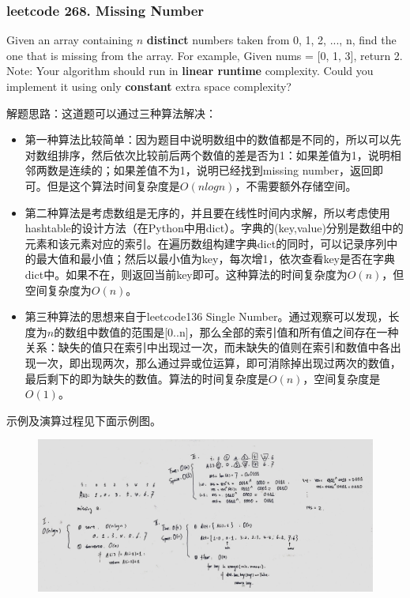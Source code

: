 \documentclass[a4paper,10pt]{article}
\begin{document}
\subsubsection{leetcode 268. Missing Number}
Given an array containing $n$ \textbf{distinct} numbers taken from 0, 1, 2, ..., n, find the one that is missing from the array. For example, Given nums = [0, 1, 3], return 2. \\

\noindent Note: Your algorithm should run in \textbf{linear runtime} complexity. Could you implement it using only \textbf{constant} extra space complexity? \\

\begin{CJK*}{UTF8}{gbsn}
\noindent 解题思路：这道题可以通过三种算法解决：
\begin{itemize}
    \item 第一种算法比较简单：因为题目中说明数组中的数值都是不同的，所以可以先对数组排序，然后依次比较前后两个数值的差是否为1：如果差值为1，说明相邻两数是连续的；如果差值不为1，说明已经找到missing number，返回即可。但是这个算法时间复杂度是$O(nlogn)$，不需要额外存储空间。
    \item 第二种算法是考虑数组是无序的，并且要在线性时间内求解，所以考虑使用hashtable的设计方法（在Python中用dict）。字典的(key,value)分别是数组中的元素和该元素对应的索引。在遍历数组构建字典dict的同时，可以记录序列中的最大值和最小值；然后以最小值为key，每次增1，依次查看key是否在字典dict中。如果不在，则返回当前key即可。这种算法的时间复杂度为$O(n)$，但空间复杂度为$O(n)$。
    \item 第三种算法的思想来自于leetcode136 Single Number。通过观察可以发现，长度为$n$的数组中数值的范围是[0..n]，那么全部的索引值和所有值之间存在一种关系：缺失的值只在索引中出现过一次，而未缺失的值则在索引和数值中各出现一次，即出现两次，那么通过异或位运算，即可消除掉出现过两次的数值，最后剩下的即为缺失的数值。算法的时间复杂度是$O(n)$，空间复杂度是$O(1)$。
\end{itemize}
示例及演算过程见下面示例图。
\end{CJK*}

\begin{figure}[h]
    \includegraphics[width=\textwidth]{leetcode268.jpg}
    \centering \\
\end{figure}
\end{document}
